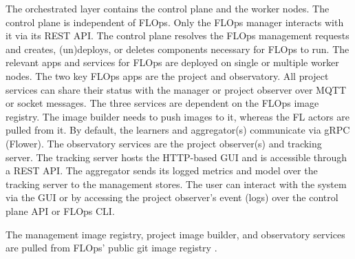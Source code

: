 The orchestrated layer contains the control plane and the worker nodes.
The control plane is independent of FLOps.
Only the FLOps manager interacts with it via its REST API.
The control plane resolves the FLOps management requests and creates, (un)deploys, or deletes components necessary for FLOps to run.
The relevant apps and services for FLOps are deployed on single or multiple worker nodes.
The two key FLOps apps are the project and observatory.
All project services can share their status with the manager or project observer over MQTT or socket messages.
The three services are dependent on the FLOps image registry.
The image builder needs to push images to it, whereas the FL actors are pulled from it.
By default, the learners and aggregator(s) communicate via gRPC (Flower).
The observatory services are the project observer(s) and tracking server.
The tracking server hosts the HTTP-based GUI and is accessible through a REST API.
The aggregator sends its logged metrics and model over the tracking server to the management stores.
The user can interact with the system via the GUI or by accessing the project observer's event (logs) over the control plane API or FLOps CLI.

The management image registry, project image builder, and observatory services are pulled from FLOps' public git image registry \cite{flops_code}.


